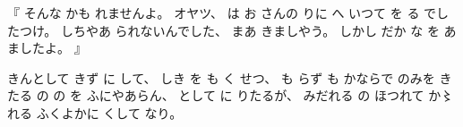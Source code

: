 %
『
そんな
かも
れませんよ。
%
オヤツ、
%
は
お
さんの
りに
へ%
いつて
を
る
でしたつけ。
%
しちやあ
られないんでした、
%
まあ
きましやう。
%
しかし
だか
な%
を
あ
ましたよ。
』

%
きんとして
きず
に
して、
%
しき
を
も
く
せつ、
%
も
らず
も
かならで
のみを
きたる
の
の
を
ふにやあらん、
%
として
に
りたるが、
%
みだれる
の
ほつれて
か〻れる%
ふくよかに
くして
なり。%
